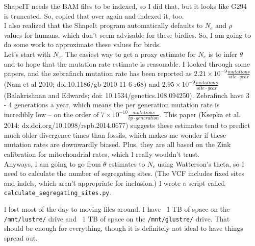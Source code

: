 \documentclass[idxtotoc,hyperref,openany,oneside]{labbook} %
\begin{document}
ShapeIT needs the BAM files to be indexed, so I did that, but it looks like G294 is truncated. So, copied that over again and indexed it, too. \\

I also realized that the ShapeIt program automatically defaults to $N_e$ and $\rho$ values for humans, which don't seem advisable for these birdies. So, I am going to do some work to approximate these values for birds. \\

Let's start with $N_e$. The easiest way to get a proxy estimate for $N_e$ is to infer $\theta$ and to hope that the mutation rate estimate is reasonable. I looked through some papers, and the zebrafinch mutation rate has been reported as $2.21 \times 10^{-9} \frac{mutations}{site \cdot year}$ (Nam et al 2010; doi:10.1186/gb-2010-11-6-r68) and $2.95 \times 10^{-9} \frac{mutations}{site \cdot year}$ (Balakrishnan and Edwards; doi: 10.1534/genetics.108.094250). Zebrafinch have 3 - 4 generations a year, which means the per generation mutation rate is incredibly low -- on the order of $7 \times 10^{-10} \frac{mutations}{bp \cdot generation}$. This paper (Ksepka et al. 2014; dx.doi.org/10.1098/rspb.2014.0677) suggests these estimates tend to predict much older divergence times than fossils, which makes me wonder if these mutation rates are downwardly biased. Plus, they are all based on the Zink calibration for mitochondrial rates, which I really wouldn't trust. \\

Anyways, I am going to go from $\theta$ estimates to $N_e$ using Watterson's theta, so I need to calculate the number of segregating sites. (The VCF includes fixed sites and indels, which aren't appropriate for inclusion.) I wrote a script called \texttt{calculate\_segregating\_sites.py}.



I lost most of the day to moving files around. I have ~1 TB of space on the \texttt{/mnt/lustre/} drive and ~1 TB of space on the \texttt{/mnt/glustre/} drive. That should be enough for everything, though it is definitely not ideal to have things spread out. \\
\end{document}
